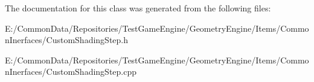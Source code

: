 The documentation for this class was generated from the following files\+:\begin{DoxyCompactItemize}
\item 
E\+:/\+Common\+Data/\+Repositories/\+Test\+Game\+Engine/\+Geometry\+Engine/\+Items/\+Common\+Inerfaces/Custom\+Shading\+Step.\+h\item 
E\+:/\+Common\+Data/\+Repositories/\+Test\+Game\+Engine/\+Geometry\+Engine/\+Items/\+Common\+Inerfaces/Custom\+Shading\+Step.\+cpp\end{DoxyCompactItemize}

